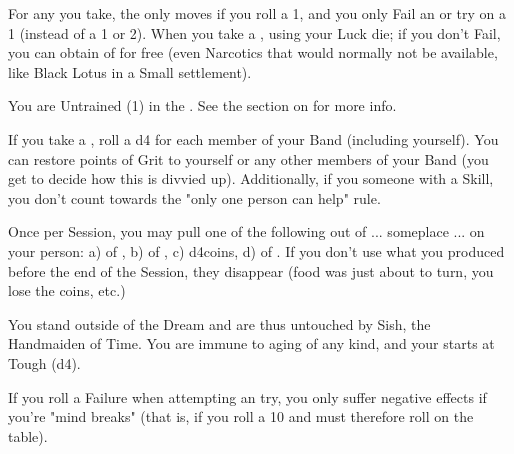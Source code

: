 \begin{multicols*}{2}

    For any  you take, the \UD only moves \DCDOWN if you roll a 1, and you only Fail an  or  try on a 1 (instead of a 1 or 2).  When you take a , \RS using your Luck die; if you don't Fail, you can obtain  of   for free (even Narcotics that would normally not be available, like Black Lotus in a Small settlement).
    


    You are Untrained (1) in the . See the section on  for more info.




    If you take a , roll a d4 for each member of your Band (including yourself). You can restore \SUM points of Grit to yourself or any other members of your Band (you get to decide how this is divvied up).  Additionally, if you  someone with a Skill, you don't count towards the "only one person can help" rule.

\newpage


Once per Session, you may pull one of the following out of ... someplace ... on your person:  a)  of , b)  of , c) d4\AG coins, d)  of . If you don't use what you produced before the end of the Session, they disappear (food was just about to turn, you lose the coins, etc.)


  You stand outside of the Dream and are thus untouched by Sish, the Handmaiden of Time. You are immune to aging of any kind, and your \DEATH starts at Tough (d4).



   If you roll a Failure when attempting an  try, you only suffer negative effects if you're "mind breaks" (that is, if you roll a 10 and must therefore roll on the  table).




\end{multicols*}
